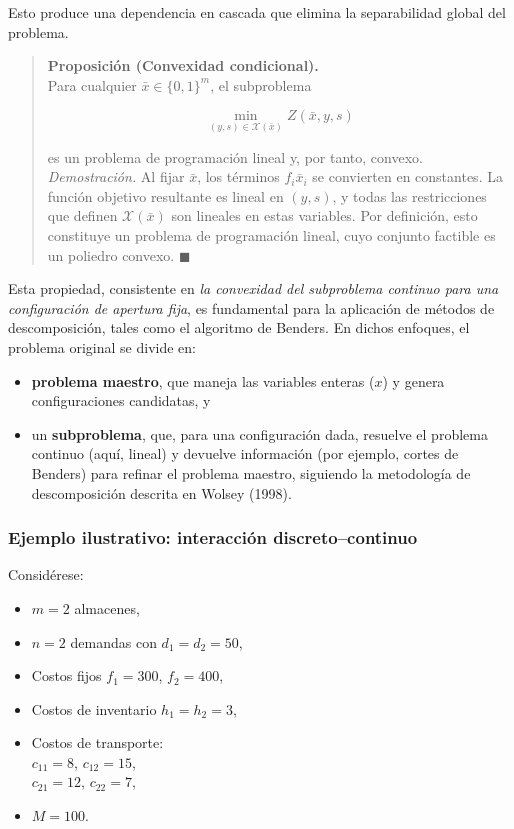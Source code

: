 \documentclass[
  spanish,
  us-letterpaper,
]{scrreprt}
\providecommand{\tightlist}{%
  \setlength{\itemsep}{0pt}\setlength{\parskip}{0pt}}
\numberwithin{equation}{section}
\begin{document}
Esto produce una dependencia en cascada que elimina la separabilidad
global del problema.

\begin{quote}
\textbf{Proposición (Convexidad condicional).}\\
Para cualquier \(\bar{x} \in \{0,1\}^m\), el subproblema

\[
\min_{(y,s) \in \mathcal{X}(\bar{x})} Z(\bar{x}, y, s)
\]

es un problema de programación lineal y, por tanto, convexo.\\
\emph{Demostración.} Al fijar \(\bar{x}\), los términos
\(f_i \bar{x}_i\) se convierten en constantes. La función objetivo
resultante es lineal en \((y,s)\), y todas las restricciones que definen
\(\mathcal{X}(\bar{x})\) son lineales en estas variables. Por
definición, esto constituye un problema de programación lineal, cuyo
conjunto factible es un poliedro convexo. \(\blacksquare\)
\end{quote}

Esta propiedad, consistente en \emph{la convexidad del subproblema
continuo para una configuración de apertura fija}, es fundamental para
la aplicación de métodos de descomposición, tales como el algoritmo de
Benders. En dichos enfoques, el problema original se divide en:

\begin{itemize}
\tightlist
\item
  \textbf{problema maestro}, que maneja las variables enteras (\(x\)) y
  genera configuraciones candidatas, y
\item
  un \textbf{subproblema}, que, para una configuración dada, resuelve el
  problema continuo (aquí, lineal) y devuelve información (por ejemplo,
  cortes de Benders) para refinar el problema maestro, siguiendo la
  metodología de descomposición descrita en Wolsey (1998).
\end{itemize}

\subsubsection{Ejemplo ilustrativo: interacción
discreto--continuo}\label{ejemplo-ilustrativo-interacciuxf3n-discretocontinuo}

Considérese:

\begin{itemize}
\tightlist
\item
  \(m=2\) almacenes,\\
\item
  \(n=2\) demandas con \(d_1=d_2=50\),\\
\item
  Costos fijos \(f_1=300\), \(f_2=400\),\\
\item
  Costos de inventario \(h_1=h_2=3\),\\
\item
  Costos de transporte:\\
  \(c_{11}=8\), \(c_{12}=15\),\\
  \(c_{21}=12\), \(c_{22}=7\),\\
\item
  \(M=100\).
\end{itemize}
\end{document}
